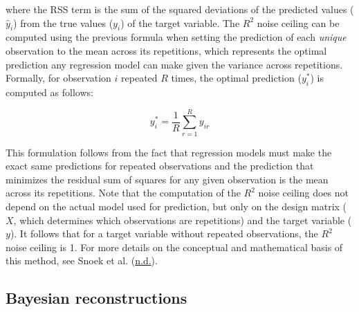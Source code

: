 \documentclass[12pt,american,a4paper,oneside,]{memoir} %
\begin{document}
where the RSS term is the sum of the squared deviations of the predicted values (\(\hat{y}_{i}\)) from the true values (\(y_{i}\)) of the target variable. The \(R^{2}\) noise ceiling can be computed using the previous formula when setting the prediction of each \emph{unique} observation to the mean across its repetitions, which represents the optimal prediction any regression model can make given the variance across repetitions. Formally, for observation \(i\) repeated \(R\) times, the optimal prediction (\(y_{i}^{*}\)) is computed as follows:

\begin{equation}
y_{i}^{*} = \frac{1}{R}\sum_{r=1}^{R}y_{ir}
\end{equation}

This formulation follows from the fact that regression models must make the exact same predictions for repeated observations and the prediction that minimizes the residual sum of squares for any given observation is the mean across its repetitions. Note that the computation of the \(R^{2}\) noise ceiling does not depend on the actual model used for prediction, but only on the design matrix (\(X\), which determines which observations are repetitions) and the target variable (\(y\)). It follows that for a target variable without repeated observations, the \(R^{2}\) noise ceiling is 1. For more details on the conceptual and mathematical basis of this method, see Snoek et al. (\protect\hyperlink{ref-snoek-submitted}{n.d.}).

\hypertarget{svsd-bayes}{%
\subsection{Bayesian reconstructions}\label{svsd-bayes}}
\end{document}
